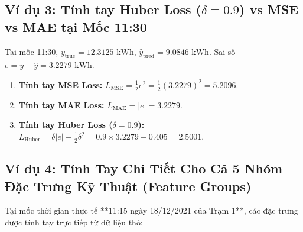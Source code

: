 \documentclass[12pt,a4paper]{article}
\begin{document}
\subsection{Ví dụ 3: Tính tay Huber Loss (\texorpdfstring{$\delta=0.9$}{delta=0.9}) vs MSE vs MAE tại Mốc 11:30}
Tại mốc 11:30, $y_{\text{true}} = 12.3125 \text{ kWh}$, $\hat{y}_{\text{pred}} = 9.0846 \text{ kWh}$. Sai số $e = y - \hat{y} = 3.2279 \text{ kWh}$.
\begin{enumerate}
    \item \textbf{Tính tay MSE Loss:} $L_{\text{MSE}} = \frac{1}{2} e^2 = \frac{1}{2} (3.2279)^2 = \mathbf{5.2096}$.
    \item \textbf{Tính tay MAE Loss:} $L_{\text{MAE}} = |e| = \mathbf{3.2279}$.
    \item \textbf{Tính tay Huber Loss ($\delta=0.9$):} $L_{\text{Huber}} = \delta |e| - \frac{1}{2}\delta^2 = 0.9 \times 3.2279 - 0.405 = \mathbf{2.5001}$.
\end{enumerate}

\subsection{Ví dụ 4: Tính Tay Chi Tiết Cho Cả 5 Nhóm Đặc Trưng Kỹ Thuật (Feature Groups)}
Tại mốc thời gian thực tế **11:15 ngày 18/12/2021 của Trạm 1**, các đặc trưng được tính tay trực tiếp từ dữ liệu thô:
\end{document}

